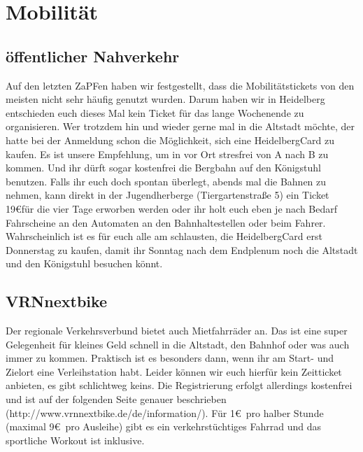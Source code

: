 \section{Mobilität}
  \subsection{öffentlicher Nahverkehr}
    Auf den letzten ZaPFen haben wir festgestellt, dass die Mobilitätstickets von den meisten
    nicht sehr häufig genutzt wurden. Darum haben wir in Heidelberg entschieden euch
    dieses Mal kein Ticket für das lange Wochenende zu organisieren.
    Wer trotzdem hin und wieder gerne mal in die Altstadt möchte, der hatte bei
    der Anmeldung schon die Möglichkeit, sich eine HeidelbergCard zu kaufen.
    Es ist unsere Empfehlung, um in vor Ort stresfrei von A nach B zu kommen.
    Und ihr dürft sogar kostenfrei die Bergbahn auf den Königstuhl benutzen.
    Falls ihr euch doch spontan überlegt, abends mal die Bahnen zu nehmen, kann
    direkt in der Jugendherberge (Tiergartenstraße 5) ein Ticket 19\euro für die vier Tage
    erworben werden oder ihr holt euch eben je nach Bedarf Fahrscheine an den Automaten
    an den Bahnhaltestellen oder beim Fahrer.
    Wahrscheinlich ist es für euch alle am schlausten, die HeidelbergCard erst Donnerstag zu kaufen,
    damit ihr Sonntag nach dem Endplenum noch die Altstadt und den Königstuhl besuchen könnt.
  \subsection{VRNnextbike}
    Der regionale Verkehrsverbund bietet auch Mietfahrräder an. Das ist eine super Gelegenheit
    für kleines Geld schnell in die Altstadt, den Bahnhof oder was auch immer zu kommen.
    Praktisch ist es besonders dann, wenn ihr am Start- und Zielort eine Verleihstation habt.
    Leider können wir euch hierfür kein Zeitticket anbieten, es gibt schlichtweg keins.
    Die Registrierung erfolgt allerdings kostenfrei und ist auf der folgenden Seite genauer beschrieben
    (http://www.vrnnextbike.de/de/information/).
    Für 1\euro \, pro halber Stunde (maximal 9\euro \, pro Ausleihe) gibt es ein verkehrstüchtiges
    Fahrrad und das sportliche Workout ist inklusive.
